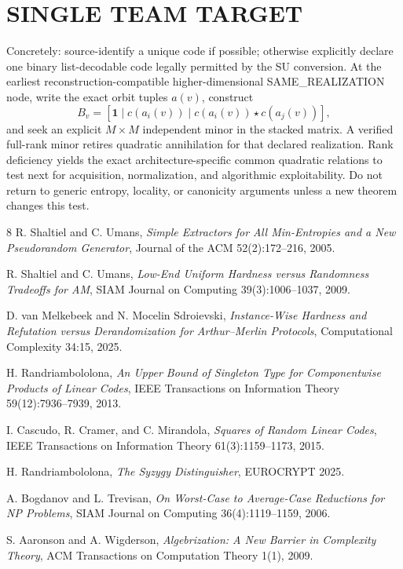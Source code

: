 \documentclass[11pt]{article}
\begin{document}
\section*{SINGLE TEAM TARGET}

Concretely: source-identify a unique code if possible; otherwise explicitly declare one binary list-decodable code legally permitted by the SU conversion. At the earliest reconstruction-compatible higher-dimensional SAME\_REALIZATION node, write the exact orbit tuples \(a(v)\), construct
\[
B_v=
[\mathbf1\mid c(a_i(v))\mid c(a_i(v))\star c(a_j(v))],
\]
and seek an explicit \(M\times M\) independent minor in the stacked matrix. A verified full-rank minor retires quadratic annihilation for that declared realization. Rank deficiency yields the exact architecture-specific common quadratic relations to test next for acquisition, normalization, and algorithmic exploitability. Do not return to generic entropy, locality, or canonicity arguments unless a new theorem changes this test.

\begin{thebibliography}{8}
R. Shaltiel and C. Umans,
\emph{Simple Extractors for All Min-Entropies and a New Pseudorandom Generator},
Journal of the ACM 52(2):172--216, 2005.

R. Shaltiel and C. Umans,
\emph{Low-End Uniform Hardness versus Randomness Tradeoffs for AM},
SIAM Journal on Computing 39(3):1006--1037, 2009.

D. van Melkebeek and N. Mocelin Sdroievski,
\emph{Instance-Wise Hardness and Refutation versus Derandomization for Arthur--Merlin Protocols},
Computational Complexity 34:15, 2025.

H. Randriambololona,
\emph{An Upper Bound of Singleton Type for Componentwise Products of Linear Codes},
IEEE Transactions on Information Theory 59(12):7936--7939, 2013.

I. Cascudo, R. Cramer, and C. Mirandola,
\emph{Squares of Random Linear Codes},
IEEE Transactions on Information Theory 61(3):1159--1173, 2015.

H. Randriambololona,
\emph{The Syzygy Distinguisher},
EUROCRYPT 2025.

A. Bogdanov and L. Trevisan,
\emph{On Worst-Case to Average-Case Reductions for NP Problems},
SIAM Journal on Computing 36(4):1119--1159, 2006.

S. Aaronson and A. Wigderson,
\emph{Algebrization: A New Barrier in Complexity Theory},
ACM Transactions on Computation Theory 1(1), 2009.
\end{thebibliography}
\end{document}
